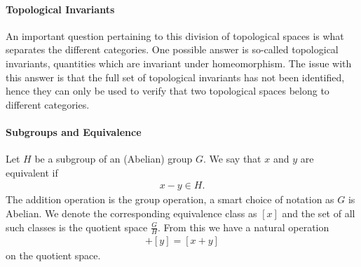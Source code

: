 \paragraph{Topological Invariants}
An important question pertaining to this division of topological spaces is what separates the different categories. One possible answer is so-called topological invariants, quantities which are invariant under homeomorphism. The issue with this answer is that the full set of topological invariants has not been identified, hence they can only be used to verify that two topological spaces belong to different categories.

\paragraph{Subgroups and Equivalence}
Let $H$ be a subgroup of an (Abelian) group $G$. We say that $x$ and $y$ are equivalent if
\begin{align*}
	x - y\in H.
\end{align*}
The addition operation is the group operation, a smart choice of notation as $G$ is Abelian. We denote the corresponding equivalence class as $[x]$ and the set of all such classes is the quotient space $\frac{G}{H}$. From this we have a natural operation
\begin{align*}
	[x] + [y] = [x + y]
\end{align*}
on the quotient space.